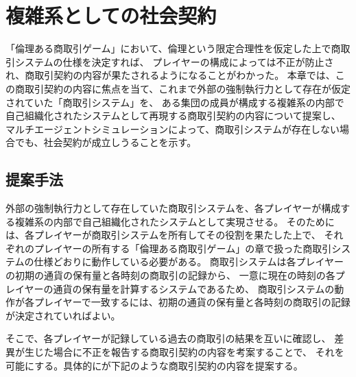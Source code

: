\chapter{複雑系としての社会契約}
「倫理ある商取引ゲーム」において、倫理という限定合理性を仮定した上で商取引システムの仕様を決定すれば、
プレイヤーの構成によっては不正が防止され、商取引契約の内容が果たされるようになることがわかった。
本章では、この商取引契約の内容に焦点を当て、これまで外部の強制執行力として存在が仮定されていた「商取引システム」を、
ある集団の成員が構成する複雑系の内部で自己組織化されたシステムとして再現する商取引契約の内容について提案し、
マルチエージェントシミュレーションによって、商取引システムが存在しない場合でも、社会契約が成立しうることを示す。

\section{提案手法}
外部の強制執行力として存在していた商取引システムを、各プレイヤーが構成する複雑系の内部で自己組織化されたシステムとして実現させる。
そのためには、各プレイヤーが商取引システムを所有してその役割を果たした上で、
それぞれのプレイヤーの所有する「倫理ある商取引ゲーム」の章で扱った商取引システムの仕様どおりに動作している必要がある。
商取引システムは各プレイヤーの初期の通貨の保有量と各時刻の商取引の記録から、
一意に現在の時刻の各プレイヤーの通貨の保有量を計算するシステムであるため、
商取引システムの動作が各プレイヤーで一致するには、初期の通貨の保有量と各時刻の商取引の記録が決定されていればよい。

そこで、各プレイヤーが記録している過去の商取引の結果を互いに確認し、
差異が生じた場合に不正を報告する商取引契約の内容を考案することで、
それを可能にする。具体的にが下記のような商取引契約の内容を提案する。

